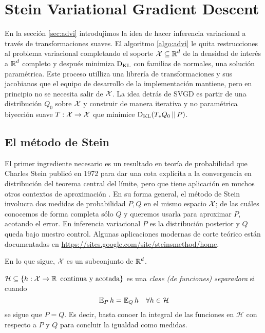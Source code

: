 \documentclass[main.tex]{subfiles}
\begin{document}
\chapter{Stein Variational Gradient Descent}
En la sección \ref{sec:advi} introdujimos la idea de hacer inferencia variacional a través de transformaciones suaves. El algoritmo \eqref{algo:advi} le quita restrucciones al problema variacional completando el soporte $\operatorname{\mathcal{X}}\subseteq\operatorname{\mathbb{R}}^d$ de la densidad de interés a $\operatorname{\mathbb{R}}^d$ completo y después minimiza $\operatorname*{D_{KL}}$ con familias de normales, una solución paramétrica. Este proceso utilliza una librería de transformaciones y sus jacobianos que el equipo de desarrollo de la implementación mantiene\cite{advi}, pero en principio no se necesita salir de $\operatorname{\mathcal{X}}$. La idea detrás de SVGD es partir de una distribución $Q_0$ sobre $\operatorname{\mathcal{X}}$ y construir de manera iterativa y no paramétrica biyección suave $T: \operatorname{\mathcal{X}} \to \operatorname{\mathcal{X}}$ que minimice $\operatorname*{D_{KL}}(T_*Q_0\operatorname*{\mid\mid} P)$.

\section{El método de Stein}

El primer ingrediente necesario es un resultado en teoría de probabilidad que Charles Stein publicó en 1972 para dar una cota explícita a la convergencia en distribución del teorema central del límite, pero que tiene aplicación en muchos otros contextos de aproximación \cite{stein-magic-method, formal-stein-method}. En su forma general, el método de Stein involucra dos medidas de probabilidad $P, Q$ en el mismo espacio $\operatorname{\mathcal{X}}$; de las cuáles conocemos de forma completa sólo $Q$ y queremos usarla para aproximar $P$, acotando el error. En inferencia variacional $P$ es la distribución posterior y $Q$ queda bajo nuestro control. Algunas aplicaciones modernas de corte teórico están documentadas en \url{https://sites.google.com/site/steinsmethod/home}. 


En lo que sigue, $\operatorname{\mathcal{X}}$ es un subconjunto de $\operatorname{\mathbb{R}}^d$.

\begin{definition}
    $ \mathcal{H} \subseteq \{h: \operatorname{\mathcal{X}} \to \operatorname{\mathbb{{R}}} \textrm{ continua y acotada}\}$ es una \textit{clase (de funciones) separadora} si cuando 
    \begin{equation*}
        \operatorname{\mathbb{E}}_Ph = \operatorname{\mathbb{E}}_Qh \quad \forall h \in \mathcal{H} 
    \end{equation*}
    se sigue que $P=Q$. Es decir, basta conoer la integral de las funciones en $\mathcal{H}$ con respecto a $P$ y $Q$ para concluir la igualdad como medidas.
\end{definition}
\end{document}
